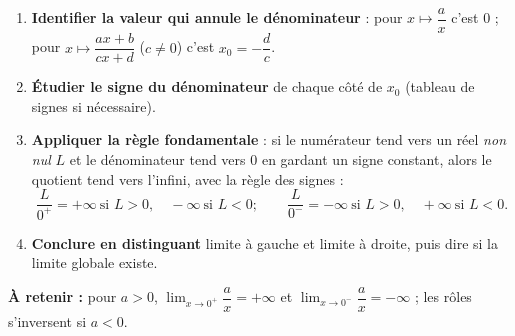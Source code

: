 \documentclass[11pt]{article}
\begin{document}
\begin{methode}
\begin{enumerate}
\item \textbf{Identifier la valeur qui annule le dénominateur} : pour $x\mapsto\dfrac{a}{x}$ c'est $0$ ; pour $x\mapsto\dfrac{ax+b}{cx+d}$ ($c\neq 0$) c'est $x_0=-\dfrac{d}{c}$.
\item \textbf{Étudier le signe du dénominateur} de chaque côté de $x_0$ (tableau de signes si nécessaire).
\item \textbf{Appliquer la règle fondamentale} : si le numérateur tend vers un réel \emph{non nul} $L$ et le dénominateur tend vers $0$ en gardant un signe constant, alors le quotient tend vers l'infini, avec la règle des signes :
\[ \frac{L}{0^+}=+\infty\ \text{si } L>0,\quad -\infty\ \text{si } L<0 ;\qquad \frac{L}{0^-}=-\infty\ \text{si } L>0,\quad +\infty\ \text{si } L<0. \]
\item \textbf{Conclure en distinguant} limite à gauche et limite à droite, puis dire si la limite globale existe.
\end{enumerate}
\textbf{À retenir :} pour $a>0$, $\lim_{x\to 0^+}\dfrac{a}{x}=+\infty$ et $\lim_{x\to 0^-}\dfrac{a}{x}=-\infty$ ; les rôles s'inversent si $a<0$.
\end{methode}
\end{document}
